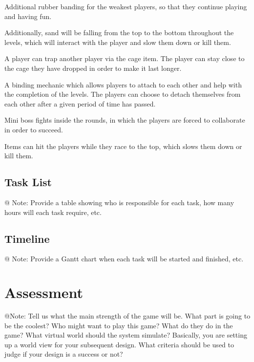 Additional rubber banding for the weakest players, so that they continue playing and having fun.

Additionally, sand will be falling from the top to the bottom throughout the levels, which will interact with the player and slow them down or kill them.

A player can trap another player via the cage item. The player can stay close to the cage they have dropped in order to make it last longer.

A binding mechanic which allows players to attach to each other and help with the completion of the levels. The players can choose to detach themselves from each other after a given period of time has passed.

Mini boss fights inside the rounds, in which the players are forced to collaborate in order to succeed.

Items can hit the players while they race to the top, which slows them down or kill them.

\subsection{Task List}




\begin{TempText}
	@ Note: Provide a table showing who is responsible for each task, how many hours will each task require, etc.
\end{TempText}




\subsection{Timeline}

\begin{TempText}
	@ Note: Provide a Gantt chart when each task will be started and finished, etc.
\end{TempText}


\section{Assessment}

\begin{TempText}
	@Note: Tell us what the main strength of the game will be. What part is going to be the coolest? Who might want to play this game? What do they do in the game? What virtual world should the system simulate? Basically, you are setting up a world view for your subsequent design. What criteria should be used to judge if your design is a success or not?
\end{TempText}


